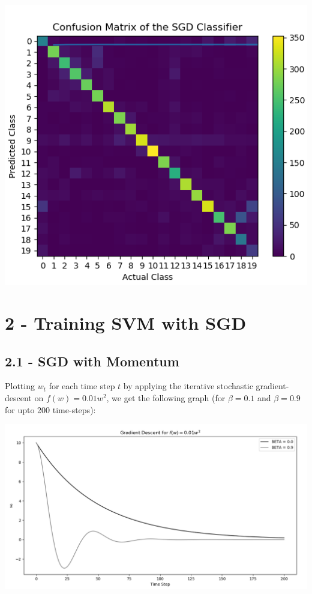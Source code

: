 \documentclass[10pt]{article}
\begin{document}
\begin{center}
\includegraphics[scale=0.75]{1.png}
\end{center}




\section{2 - Training SVM with SGD}
\subsection{2.1 - SGD with Momentum}

Plotting $w_t$ for each time step $t$ by applying the iterative stochastic gradient-descent on $ f(w) = 0.01w^2$, we get the following graph (for $\beta = 0.1$ and $\beta = 0.9$ for upto 200 time-steps):

\begin{center}
\includegraphics[scale=0.5]{2_1.png}
\end{center}
\end{document}
